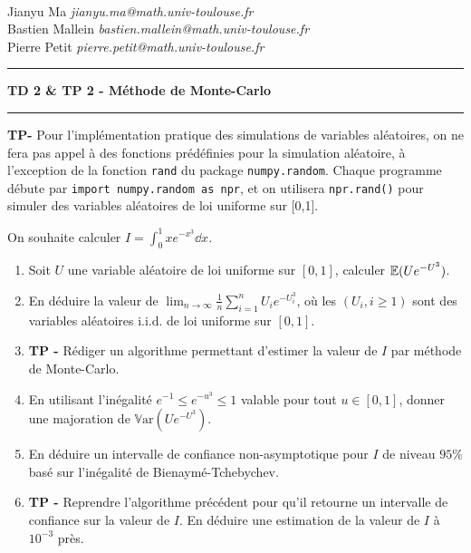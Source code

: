 \documentclass[solutions]{exercices}
\begin{document}
{
\\
Jianyu Ma \hfill \textit{jianyu.ma@math.univ-toulouse.fr}\\
Bastien Mallein \hfill \textit{bastien.mallein@math.univ-toulouse.fr}\\
Pierre Petit \hfill \textit{pierre.petit@math.univ-toulouse.fr}}


\vspace{2ex}

 \hrule
\begin{center}
\textbf{\large TD 2 \& TP 2 - Méthode de Monte-Carlo}
\vspace{2ex}
\end{center}
\hrule

\bigskip

\textbf{TP-} Pour l'implémentation pratique des simulations de variables aléatoires, on ne fera pas appel à des fonctions prédéfinies pour la simulation aléatoire, à l'exception de la fonction \texttt{rand} du package \texttt{numpy.random}. Chaque programme débute par \texttt{import numpy.random as npr}, et on utilisera \texttt{npr.rand()} pour simuler des variables aléatoires de loi uniforme sur [0,1].

\begin{exercice}
On souhaite calculer $I = \int_0^{1} x e^{-x^3} \dd x$.
\begin{enumerate}
  \item Soit $U$ une variable aléatoire de loi uniforme sur $[0,1]$, calculer $\mathbb{E}(U e^{-U^3})$.
  \item En déduire la valeur de $\lim_{n \to \infty} \frac{1}{n} \sum_{i=1}^n U_i e^{-U_i^3}$, où les $(U_i, i \geq 1)$ sont des variables aléatoires i.i.d. de loi uniforme sur $[0,1]$.
  \item \textbf{TP -} Rédiger un algorithme permettant d'estimer la valeur de $I$ par méthode de Monte-Carlo.
  \item En utilisant l'inégalité $e^{-1} \leq e^{-u^3} \leq 1$ valable pour tout $u \in [0,1]$, donner une majoration de $\mathbb{V}\mathrm{ar}(Ue^{-U^3})$.
  \item En déduire un intervalle de confiance non-asymptotique pour $I$ de niveau $95\%$ basé sur l'inégalité de Bienaymé-Tchebychev.
  \item \textbf{TP -} Reprendre l'algorithme précédent pour qu'il retourne un intervalle de confiance sur la valeur de $I$. En déduire une estimation de la valeur de $I$ à $10^{-3}$ près.
\end{enumerate}
\end{exercice}
\end{document}
